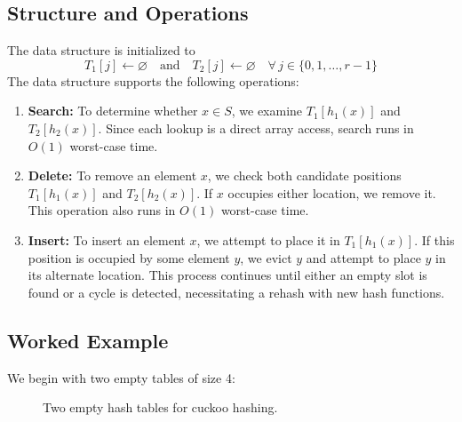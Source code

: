 \subsection{Structure and Operations}

The data structure is initialized to 
\[
  T_1[j] \leftarrow \varnothing \quad \text{and} \quad T_2[j] \leftarrow \varnothing 
  \quad \forall \, j \in \{0, 1, \dots, r-1\}
\]
The data structure supports the following operations:
\begin{enumerate}
  \item \textbf{Search:} To determine whether $x \in S$, we examine 
        $T_1[h_1(x)]$ and $T_2[h_2(x)]$. Since each lookup is a direct 
        array access, search runs in $O(1)$ worst-case time.
        
  \item \textbf{Delete:} To remove an element $x$, we check both candidate 
        positions $T_1[h_1(x)]$ and $T_2[h_2(x)]$. If $x$ occupies either 
        location, we remove it. This operation also runs in $O(1)$ worst-case time.
        
  \item \textbf{Insert:} To insert an element $x$, we attempt to place it 
        in $T_1[h_1(x)]$. If this position is occupied by some element $y$, 
        we evict $y$ and attempt to place $y$ in its alternate location. 
        This process continues until either an empty slot is found or a 
        cycle is detected, necessitating a rehash with new hash functions.
\end{enumerate}



\subsection{Worked Example}

We begin with two empty tables of size 4:

\begin{figure}[H]
  \centering
  \caption{Two empty hash tables for cuckoo hashing.}
  \label{fig:cuckoo-empty}
\end{figure}

